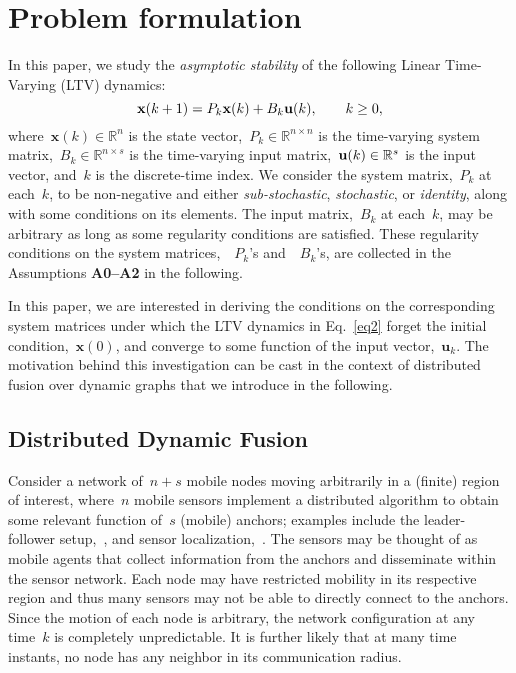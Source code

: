 \documentclass[draftclsnofoot, onecolumn, 12pt]{IEEEtran}
\def\mb{\mathbf}
\def\mbb{\mathbb}
\begin{document}
\section{Problem formulation}\label{PF}
In this paper, we study the \textit{asymptotic stability} of the following Linear Time-Varying (LTV) dynamics:
\begin{equation}\label{eq2}
{\bf{x}}(k+1)={{P}}_k{\bf{x}}(k)+{{B}}_k{\bf{u}}(k),\qquad k \geq 0,
\end{equation}
where~${\mb{x}}(k)\in\mbb{R}^n$ is the state vector,~${{P}}_k\in\mbb{R}^{n \times n}$ is the time-varying system matrix,~${B}_k\in\mbb{R}^{n \times s}$ is the time-varying input matrix,~${\bf{u}}(k)\in\mbb{R}^s$ is the input vector, and~$k$ is the discrete-time index. We consider the system matrix,~${P}_k$ at each~$k$, to be non-negative and either \emph{sub-stochastic}, \emph{stochastic}, or \emph{identity}, along with some  conditions on its elements. The input matrix,~${B}_k$ at each~$k$, may be arbitrary as long as some regularity conditions are satisfied. These regularity conditions on the system matrices,~~${P}_k$'s and~~${B}_k$'s, are collected in the Assumptions {\bf A0--A2} in the following. 

In this paper, we are interested in deriving the conditions on the corresponding system matrices under which the LTV dynamics in Eq.~\eqref{eq2} forget the initial condition,~$\mb{x}(0)$, and converge to some function of the input vector,~$\mb{u}_k$. The motivation behind this investigation can be cast in the context of distributed fusion over dynamic graphs that we introduce in the following. 

\subsection{Distributed Dynamic Fusion} 
Consider a network of~$n+s$ mobile nodes moving arbitrarily in a (finite) region of interest, where~$n$ mobile sensors implement a distributed algorithm to obtain some relevant function of~$s$ (mobile) anchors; examples include the leader-follower setup,~\cite{tanner02,4200874}, and sensor localization,~\cite{khan2009distributed,khan2010diland}. The sensors may be thought of as mobile agents that collect information from the anchors and disseminate within the sensor network. Each node may have restricted mobility in its respective region and thus many sensors may not be able to directly connect to the anchors. Since the motion of each node is arbitrary, the network configuration at any time~$k$ is completely unpredictable. It is further likely that at many time instants, no node has any neighbor in its communication radius. 
\end{document}
